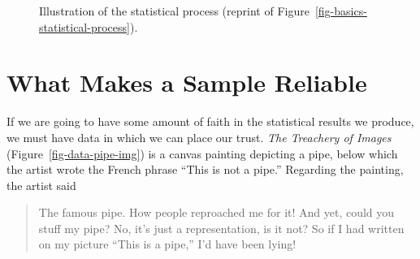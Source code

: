 \documentclass[
  letterpaper,
  DIV=11,
  numbers=noendperiod]{scrreprt}
\theoremstyle{plain}
\theoremstyle{definition}
\theoremstyle{definition}
\theoremstyle{remark}
\begin{document}
\begin{figure}


\caption{\label{fig-data-statistical-process}Illustration of the
statistical process (reprint of
Figure~\ref{fig-basics-statistical-process}).}

\end{figure}%

\section{What Makes a Sample
Reliable}\label{what-makes-a-sample-reliable}

If we are going to have some amount of faith in the statistical results
we produce, we must have data in which we can place our trust. \emph{The
Treachery of Images} (Figure~\ref{fig-data-pipe-img}) is a canvas
painting depicting a pipe, below which the artist wrote the French
phrase ``This is not a pipe.'' Regarding the painting, the artist said

\begin{quote}
The famous pipe. How people reproached me for it! And yet, could you
stuff my pipe? No, it's just a representation, is it not? So if I had
written on my picture ``This is a pipe,'' I'd have been lying!
\end{quote}
\end{document}
